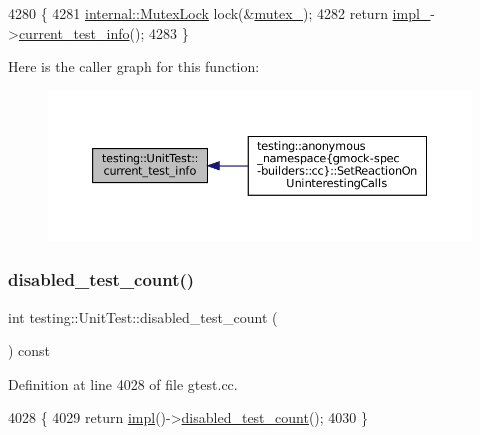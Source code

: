\begin{DoxyCode}
4280                                  \{
4281   \hyperlink{namespacetesting_1_1internal_a08b187c6cc4e28400aadf9a32fccc8de}{internal::MutexLock} lock(&\hyperlink{classtesting_1_1UnitTest_abb94ef45cf0ab43be81ac6d5b1364132}{mutex\_});
4282   \textcolor{keywordflow}{return} \hyperlink{classtesting_1_1UnitTest_a834685f92009d21b21a7307f4cbfb6e5}{impl\_}->\hyperlink{classtesting_1_1internal_1_1UnitTestImpl_a8d303ebdcf5989e96d3ed96fb7255102}{current\_test\_info}();
4283 \}
\end{DoxyCode}
Here is the caller graph for this function\+:
\nopagebreak
\begin{figure}[H]
\begin{center}
\leavevmode
\includegraphics[width=350pt]{classtesting_1_1UnitTest_a088eaf814a33085ace3d881d22e6bdea_icgraph}
\end{center}
\end{figure}
\mbox{\label{classtesting_1_1UnitTest_ad69ccf3d4a9bc7333badeafbde3bc76b}} 
\subsubsection{\texorpdfstring{disabled\+\_\+test\+\_\+count()}{disabled\_test\_count()}}
{\footnotesize\ttfamily int testing\+::\+Unit\+Test\+::disabled\+\_\+test\+\_\+count (\begin{DoxyParamCaption}{ }\end{DoxyParamCaption}) const}



Definition at line 4028 of file gtest.\+cc.


\begin{DoxyCode}
4028                                         \{
4029   \textcolor{keywordflow}{return} \hyperlink{classtesting_1_1UnitTest_a4df5d11a58affb337d7fa62eaa07690e}{impl}()->\hyperlink{classtesting_1_1internal_1_1UnitTestImpl_a0c18b2a9cb240722b1e38a3530aa2269}{disabled\_test\_count}();
4030 \}
\end{DoxyCode}
\mbox{\label{classtesting_1_1UnitTest_acf608411a17cb3b40a1e9d724f262b3b}} 
